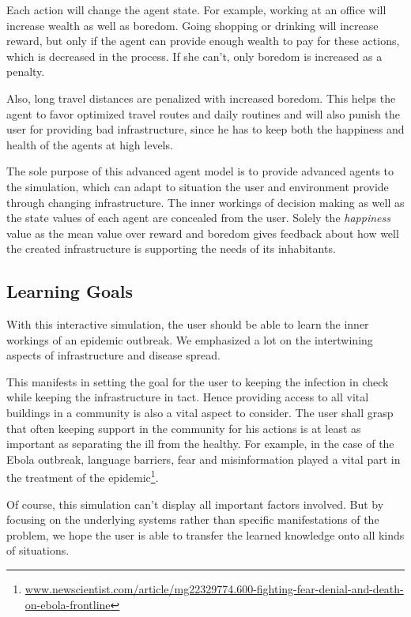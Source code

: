 \documentclass[table]{sig-alternate-05-2015}
\begin{document}
Each action will change the agent state. For example, working at an office will increase wealth as well as boredom. Going shopping or drinking will increase reward, but only if the agent can provide enough wealth to pay for these actions, which is decreased in the process. If she can't, only boredom is increased as a penalty.

Also, long travel distances are penalized with increased boredom. This helps the agent to favor optimized travel routes and daily routines and will also punish the user for providing bad infrastructure, since he has to keep both the happiness and health of the agents at high levels.

The sole purpose of this advanced agent model is to provide advanced agents to the simulation, which can adapt to situation the user and environment provide through changing infrastructure. The inner workings of decision making as well as the state values of each agent are concealed from the user. Solely the \textit{happiness} value as the mean value over reward and boredom gives feedback about how well the created infrastructure is supporting the needs of its inhabitants.

\subsection{Learning Goals}

With this interactive simulation, the user should be able to learn the inner workings of an epidemic outbreak. We emphasized a lot on the intertwining aspects of infrastructure and disease spread.

This manifests in setting the goal for the user to keeping the infection in check while keeping the infrastructure in tact. Hence providing access to all vital buildings in a community is also a vital aspect to consider. The user shall grasp that often keeping support in the community for his actions is at least as important as separating the ill from the healthy.
For example, in the case of the Ebola outbreak, language barriers, fear and misinformation played a vital part in the treatment of the epidemic\footnote{\url{www.newscientist.com/article/mg22329774.600-fighting-fear-denial-and-death-on-ebola-frontline}}. 

Of course, this simulation can't display all important factors involved. But by focusing on the underlying systems rather than specific manifestations of the problem, we hope the user is able to transfer the learned knowledge onto all kinds of situations.
\end{document}
